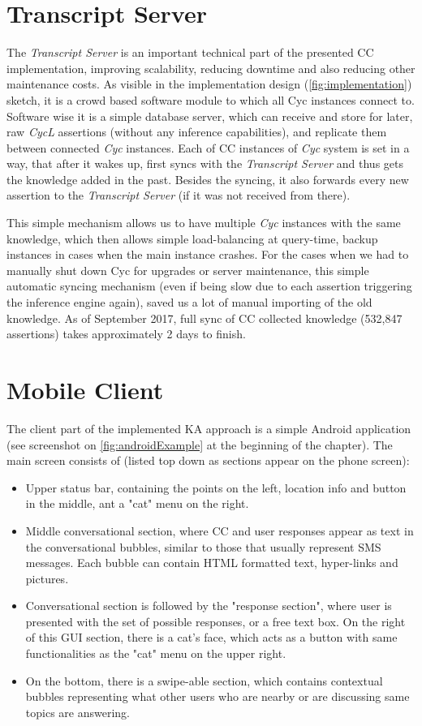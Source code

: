 \section{Transcript Server}
\label{section:transcriptserver}
The \emph{Transcript Server} is an important technical part of the presented CC 
implementation, improving scalability, reducing downtime and also reducing
other maintenance costs. As visible in the implementation design 
(\autoref{fig:implementation}) sketch, it is a crowd based software module
to which all Cyc instances connect to. Software wise it is a simple database
server, which can receive and store for later, raw \emph{CycL} assertions 
(without any inference capabilities), and replicate them between 
connected \emph{Cyc} instances. Each of CC instances of \emph{Cyc} system is
set in a way, that after it wakes up, first syncs with the \emph{Transcript 
Server} and thus gets the knowledge added in the past. Besides the syncing,
it also forwards every new assertion to the \emph{Transcript Server} (if it was
not received from there). 

This simple mechanism allows us to have multiple \emph{Cyc} instances with
the same knowledge, which then allows simple load-balancing at query-time,
backup instances in cases when the main instance crashes. For the cases when
we had to manually shut down Cyc for upgrades or server maintenance, this simple
automatic syncing mechanism (even if being slow due to each assertion triggering
the inference engine again), saved us a lot of manual importing of the old knowledge.
 As of September 2017, full sync of CC collected knowledge (532,847 
assertions) takes approximately 2 days to finish.

\section{Mobile Client}
\label{section:app}
The client part of the implemented KA approach is a simple Android application
(see screenshot on \autoref{fig:androidExample} at the beginning of the chapter).
The main screen consists of (listed top down as sections appear on the phone 
screen):
\begin{itemize}
\item Upper status bar, containing the points on the left, location info and 
button in the middle, ant a "cat" menu on the right.
\item Middle conversational section, where CC and user responses appear as
text in the conversational bubbles, similar to those that usually represent 
SMS messages. Each bubble can contain HTML formatted text, hyper-links and 
pictures.
\item Conversational section is followed by the "response section", where user
is presented with the set of possible responses, or a free text box. On the 
right of this GUI section, there is a cat's face, which acts as a button with
same functionalities as the "cat" menu on the upper right.
\item On the bottom, there is a swipe-able section, which contains contextual
bubbles representing what other users  who are nearby or are discussing same 
topics are answering.
\end{itemize} 

